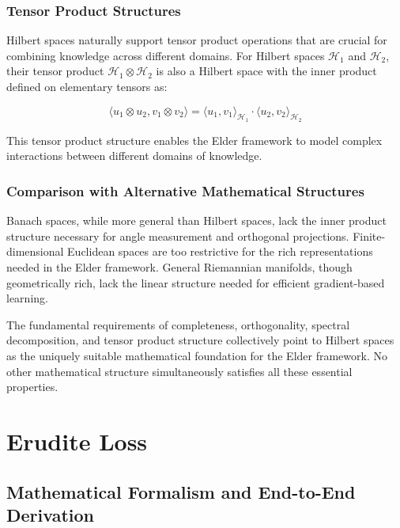 \subsubsection{Tensor Product Structures}

Hilbert spaces naturally support tensor product operations that are crucial for combining knowledge across different domains. For Hilbert spaces $\mathcal{H}_1$ and $\mathcal{H}_2$, their tensor product $\mathcal{H}_1 \otimes \mathcal{H}_2$ is also a Hilbert space with the inner product defined on elementary tensors as:

\begin{equation}
\langle u_1 \otimes u_2, v_1 \otimes v_2 \rangle = \langle u_1, v_1 \rangle_{\mathcal{H}_1} \cdot \langle u_2, v_2 \rangle_{\mathcal{H}_2}
\end{equation}

This tensor product structure enables the Elder framework to model complex interactions between different domains of knowledge.

\subsubsection{Comparison with Alternative Mathematical Structures}

Banach spaces, while more general than Hilbert spaces, lack the inner product structure necessary for angle measurement and orthogonal projections. Finite-dimensional Euclidean spaces are too restrictive for the rich representations needed in the Elder framework. General Riemannian manifolds, though geometrically rich, lack the linear structure needed for efficient gradient-based learning.

The fundamental requirements of completeness, orthogonality, spectral decomposition, and tensor product structure collectively point to Hilbert spaces as the uniquely suitable mathematical foundation for the Elder framework. No other mathematical structure simultaneously satisfies all these essential properties.

\section{Erudite Loss}

\subsection{Mathematical Formalism and End-to-End Derivation}

